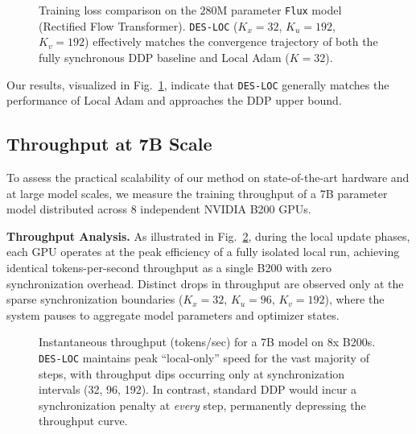 \begin{figure}[t]
\centering
\caption{Training loss comparison on the $280$M parameter \texttt{Flux} model (Rectified Flow Transformer). \texttt{DES-LOC} ($K_x=32$, $K_u=192$, $K_v=192$) effectively matches the convergence trajectory of both the fully synchronous DDP baseline and Local Adam ($K=32$).}
\label{fig:flux}
\end{figure}

Our results, visualized in Fig.~\ref{fig:flux}, indicate that \texttt{DES-LOC} generally matches the performance of Local Adam and approaches the DDP upper bound.

\begin{center}\end{center}

\subsection{Throughput at 7B Scale}
\label{sec:b9_throughput}

To assess the practical scalability of our method on state-of-the-art hardware and at large model scales, we measure the training throughput of a 7B parameter model distributed across $8$ independent NVIDIA B200 GPUs.

\textbf{Throughput Analysis.} As illustrated in Fig.~\ref{fig:throughput_7b}, during the local update phases, each GPU operates at the peak efficiency of a fully isolated local run, achieving identical tokens-per-second throughput as a single B200 with zero synchronization overhead. Distinct drops in throughput are observed only at the sparse synchronization boundaries ($K_x=32$, $K_u=96$, $K_v=192$), where the system pauses to aggregate model parameters and optimizer states.

\begin{figure}[t]
\centering
\caption{Instantaneous throughput (tokens/sec) for a 7B model on 8x B200s. \texttt{DES-LOC} maintains peak ``local-only'' speed for the vast majority of steps, with throughput dips occurring only at synchronization intervals (32, 96, 192). In contrast, standard DDP would incur a synchronization penalty at \textit{every} step, permanently depressing the throughput curve.}
\label{fig:throughput_7b}
\end{figure}

